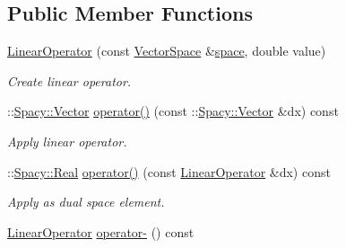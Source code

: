 \subsection*{Public Member Functions}
\begin{DoxyCompactItemize}
\item 
\hyperlink{structSpacy_1_1Scalar_1_1LinearOperator_a35809efc47f61f185314410e39397ea5}{Linear\+Operator} (const \hyperlink{classSpacy_1_1VectorSpace}{Vector\+Space} \&\hyperlink{classSpacy_1_1VectorBase_aa999dbf9d679d895dfe04c10fbf9f5e9}{space}, double value)\hypertarget{structSpacy_1_1Scalar_1_1LinearOperator_a35809efc47f61f185314410e39397ea5}{}\label{structSpacy_1_1Scalar_1_1LinearOperator_a35809efc47f61f185314410e39397ea5}

\begin{DoxyCompactList}\small\item\em Create linear operator. \end{DoxyCompactList}\item 
\+::\hyperlink{classSpacy_1_1Vector}{Spacy\+::\+Vector} \hyperlink{structSpacy_1_1Scalar_1_1LinearOperator_aa978b12a9e892a6929487c8da259d4af}{operator()} (const \+::\hyperlink{classSpacy_1_1Vector}{Spacy\+::\+Vector} \&dx) const \hypertarget{structSpacy_1_1Scalar_1_1LinearOperator_aa978b12a9e892a6929487c8da259d4af}{}\label{structSpacy_1_1Scalar_1_1LinearOperator_aa978b12a9e892a6929487c8da259d4af}

\begin{DoxyCompactList}\small\item\em Apply linear operator. \end{DoxyCompactList}\item 
\+::\hyperlink{classSpacy_1_1Real}{Spacy\+::\+Real} \hyperlink{structSpacy_1_1Scalar_1_1LinearOperator_a2a3190408928791f16d19e0af54f9dcc}{operator()} (const \hyperlink{structSpacy_1_1Scalar_1_1LinearOperator}{Linear\+Operator} \&dx) const \hypertarget{structSpacy_1_1Scalar_1_1LinearOperator_a2a3190408928791f16d19e0af54f9dcc}{}\label{structSpacy_1_1Scalar_1_1LinearOperator_a2a3190408928791f16d19e0af54f9dcc}

\begin{DoxyCompactList}\small\item\em Apply as dual space element. \end{DoxyCompactList}\item 
\hyperlink{structSpacy_1_1Scalar_1_1LinearOperator}{Linear\+Operator} \hyperlink{structSpacy_1_1Scalar_1_1LinearOperator_aba7eb546eca4983adcf2e39155af07d1}{operator-\/} () const \hypertarget{structSpacy_1_1Scalar_1_1LinearOperator_aba7eb546eca4983adcf2e39155af07d1}{}\label{structSpacy_1_1Scalar_1_1LinearOperator_aba7eb546eca4983adcf2e39155af07d1}


\end{DoxyCompactItemize}
